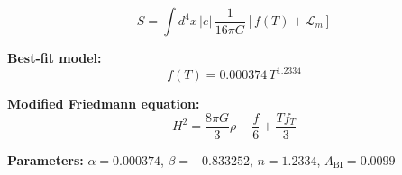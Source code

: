 
\begin{equation}
  S = \int d^4x \, |e| \, \frac{1}{16\pi G} \left[ f(T) + \mathcal{L}_m \right]
\end{equation}

\textbf{Best-fit model:}
\begin{equation}
  f(T) = 0.000374 \, T^{1.2334}
\end{equation}

\textbf{Modified Friedmann equation:}
\begin{equation}
  H^2 = \frac{8\pi G}{3} \rho - \frac{f}{6} + \frac{T f_T}{3}
\end{equation}

\textbf{Parameters:}
$\alpha = 0.000374$, \quad
$\beta = -0.833252$, \quad
$n = 1.2334$, \quad
$\Lambda_{\text{BI}} = 0.0099$